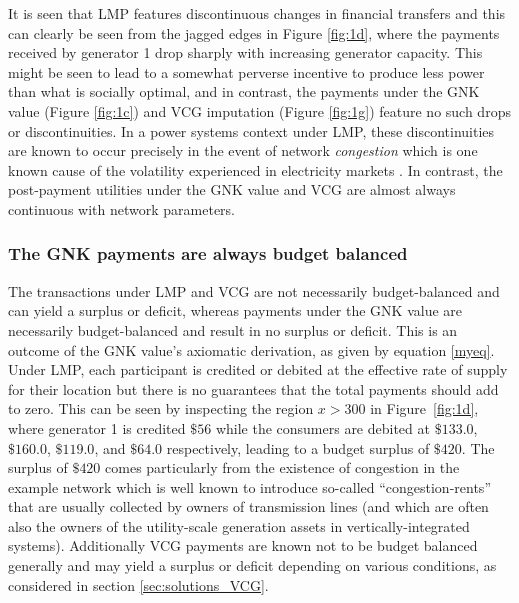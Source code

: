 It is seen that LMP features discontinuous changes in financial transfers and this can clearly be seen from the jagged edges in Figure \ref{fig:1d}, where the payments received by generator 1 drop sharply with increasing generator capacity.
This might be seen to lead to a somewhat perverse incentive to produce less power than what is socially optimal, and in contrast, the payments under the GNK value (Figure \ref{fig:1c}) and VCG imputation (Figure \ref{fig:1g}) feature no such drops or discontinuities.
In a power systems context under LMP, these discontinuities are known to occur precisely in the event of network \emph{congestion}
which is one known cause of the volatility experienced in electricity markets \cite{RePEc:aen:journl:2006v27-02-a09}. 
In contrast, the post-payment utilities under the GNK value and VCG are almost always continuous with network parameters.



\subsubsection*{The GNK payments are always budget balanced}
The transactions under LMP and VCG are not necessarily budget-balanced and can yield a surplus or deficit, whereas payments under the GNK value are necessarily budget-balanced and result in no surplus or deficit.
This is an outcome of the GNK value's axiomatic derivation, as given by equation \eqref{myeq}.
Under LMP, each participant is credited or debited at the effective rate of supply for their location but there is no guarantees that the total payments should add to zero.
This can be seen by inspecting the region $x>300$ in Figure~\ref{fig:1d}, where generator 1 is credited $\$56$ while the consumers are debited at $\$133.0$, $\$160.0$, $\$119.0$, and $\$64.0$ respectively, leading to a budget surplus of $\$420$.
The surplus of $\$420$ comes particularly from the existence of congestion in the example network which is well known to introduce so-called ``congestion-rents'' that are usually collected by owners of transmission lines \cite{lmp2} (and which are often also the owners of the utility-scale generation assets in vertically-integrated systems).
Additionally VCG payments are known not to be budget balanced generally and may yield a surplus or deficit depending on various conditions, as considered in section \ref{sec:solutions_VCG}.

